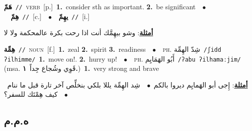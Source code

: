 \documentclass[10pt,a4paper,twoside]{article} %
\begin{document}
\begin{multicols}{2}
{\setlength\topsep{0pt}\textbf{\foreignlanguage{arabic}{هَمّ}}\ {\color{gray}\texttt{//}\color{black}}\ \textsc{verb}\ [p.]\ \textbf{1.}~consider sth as important.  \textbf{2.}~be significant\ \ $\bullet$\ \ \setlength\topsep{0pt}\textbf{\foreignlanguage{arabic}{هِمّ}}\ {\color{gray}\texttt{//}\color{black}}\ [c.]\ \ $\bullet$\ \ \setlength\topsep{0pt}\textbf{\foreignlanguage{arabic}{يهِمّ}}\ {\color{gray}\texttt{//}\color{black}}\ [i.]\  \begin{flushright}\color{gray}\foreignlanguage{arabic}{\textbf{\underline{\foreignlanguage{arabic}{أمثلة}}}: وشو بيهِمَّك أنت اذا رحت بكرة عالمحكمة ولا لا}\end{flushright}\color{black}} \vspace{2mm}

{\setlength\topsep{0pt}\textbf{\foreignlanguage{arabic}{هِمِّة}}\ {\color{gray}\texttt{//}\color{black}}\ \textsc{noun}\ [f.]\ \textbf{1.}~zeal  \textbf{2.}~spirit  \textbf{3.}~readiness\ \ $\bullet$\ \ \textsc{ph.} \color{gray} \foreignlanguage{arabic}{شِدّ الهِمِّة}\color{black}\ {\color{gray}\texttt{/{\sffamily ʃidd ʔilhimme}/}\color{black}}\ \textbf{1.}~move on!.  \textbf{2.}~hurry up!\ \ $\bullet$\ \ \textsc{ph.} \color{gray} \foreignlanguage{arabic}{أَبُو الهَمَايِم}\color{black}\ {\color{gray}\texttt{/{\sffamily ʔabu ʔilhamaːjim}/}\color{black}}\ \color{gray} (msa. \foreignlanguage{arabic}{قَوِي وشُجاع جِداً}~\foreignlanguage{arabic}{\textbf{١.}})\color{black}\ \textbf{1.}~very strong and brave\  \begin{flushright}\color{gray}\foreignlanguage{arabic}{\textbf{\underline{\foreignlanguage{arabic}{أمثلة}}}: إِجى أبو الهَمايِم ديروا بالكم\ $\bullet$\ \  شِد الهِمِّة يللا بلكي بنخلِّص آخر تارة قبل ما ننام\ $\bullet$\ \  كيف هِمْتَك للسفر؟}\end{flushright}\color{black}} \vspace{2mm}

\vspace{-3mm}
\subsection*{\color{blue}\foreignlanguage{arabic}{ه.م.م}\color{blue}{ (ntws)}} 


\end{multicols}
\end{document}
